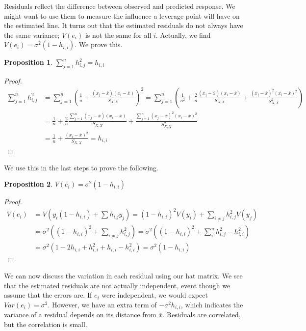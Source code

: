 \documentclass[12pt, a4paper]{article}
\theoremstyle{definition}
\newtheorem{proposition}{Proposition}
\newcommand{\ol}{\overline}
\newcommand{\f}{\frac}
\newcommand{\BB}[1]{\left(#1\right)}
\begin{document}
	Residuals reflect the difference between observed and predicted response. We might want to use them to measure the influence a leverage point will have on the estimated line. It turns out that the estimated residuals do not always have the same variance; $V(e_i)$ is not the same for all $i$. Actually, we find $V(e_i) = \sigma^2(1-h_{i,i})$. We prove this.
	\begin{proposition}
		$\sum_{j=1}^n h_{i,j}^2 = h_{i,i}$
	\end{proposition}
	\begin{proof}
		\begin{align*}
			\sum_{j=1}^n h_{i,j}^2 
			&= \sum_{j=1}^n \BB{ \f1n +  \f{(x_j - \ol x) (x_i - \ol x)}{S_{X,X}} }^2 = \sum_{j=1}^n \BB{\f1{n^2} + \f2n \f{(x_j - \ol x) (x_i - \ol x)}{S_{X,X}} + \f{(x_j - \ol x)^2 (x_i - \ol x)^2}{S_{X,X}^2}} \\
			&= \f1{n} + \f2n \f{\sum_{j=1}^n(x_j - \ol x) (x_i - \ol x)}{S_{X,X}} + \f{\sum_{j=1}^n(x_j - \ol x)^2 (x_i - \ol x)^2}{S_{X,X}^2}  \\
			&= \f1n + \f{ (x_i - \ol x)^2}{S_{X,X}} = h_{i,i}
		\end{align*}
	\end{proof}
	We use this in the last steps to prove the following.
	\begin{proposition}
		\label{e_var}
		$V(e_i) = \sigma^2(1-h_{i,i})$
	\end{proposition}
	\begin{proof}
			\begin{align*}
				V(e_i) &= V\BB{y_i(1-h_{i,i}) + \sum h_{i.j}y_j} = (1-h_{i,i})^2V(y_i) + \sum_{i \neq j} h_{i,j}^2 V(y_j) \\
				&= \sigma^2 \BB{ (1-h_{i,i})^2 + \sum_{i \neq j} h_{i,j}^2 } = \sigma^2 \BB{ (1-h_{i,i})^2 + \sum_{i}^n h_{i,j}^2 - h_{i,i}^2} \\
				&= \sigma^2 \BB{ 1 - 2 h_{i,i} + h_{i,i}^2 + h_{i,i} - h_{i,i}^2} =  \sigma^2(1-h_{i,i})
			\end{align*}
	\end{proof}
	We can now discuss the variation in each residual using our hat matrix. We see that the estimated residuals are not actually independent, event though we assume that the errors are. If $e_i$ were independent, we would expect $Var(e_i) = \sigma^2$. However, we have an extra term of $-\sigma^2 h_{i,i}$, which indicates the variance of a residual depends on its distance from $\ol x$. Residuals are correlated, but the correlation is small.\\
	
\end{document}
